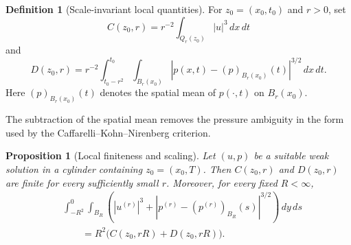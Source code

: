 \documentclass[11pt]{amsart}
\theoremstyle{plain}
\newtheorem{proposition}[proposition]{Proposition}
\theoremstyle{definition}
\newtheorem{definition}[definition]{Definition}
\theoremstyle{remark}
\numberwithin{equation}{section}
\begin{document}
\begin{definition}[Scale-invariant local quantities]
For \(z_0=(x_0,t_0)\) and \(r>0\), set
\[
  C(z_0,r)=r^{-2}\int_{Q_r(z_0)} |u|^3\,dx\,dt
\]
and
\[
  D(z_0,r)=r^{-2}
  \int_{t_0-r^2}^{t_0}\int_{B_r(x_0)}
  |p(x,t)-(p)_{B_r(x_0)}(t)|^{3/2}\,dx\,dt.
\]
Here \((p)_{B_r(x_0)}(t)\) denotes the spatial mean of \(p(\cdot,t)\) on
\(B_r(x_0)\).
\end{definition}

The subtraction of the spatial mean removes the pressure ambiguity in the form
used by the Caffarelli--Kohn--Nirenberg criterion.

\begin{proposition}[Local finiteness and scaling]\label{p0:prop:critical-scaling}
Let \((u,p)\) be a suitable weak solution in a cylinder containing
\(z_0=(x_0,T)\).  Then
\(C(z_0,r)\) and \(D(z_0,r)\) are finite for every sufficiently small \(r\).
Moreover, for every fixed \(R<\infty\),
\[
\begin{aligned}
&\int_{-R^2}^{0}\int_{B_R}
\left(
|u^{(r)}|^3+
|p^{(r)}-(p^{(r)})_{B_R}(s)|^{3/2}
\right)\,dy\,ds \\
&\qquad
=R^2\bigl(C(z_0,rR)+D(z_0,rR)\bigr).
\end{aligned}
\]
\end{proposition}
\end{document}
